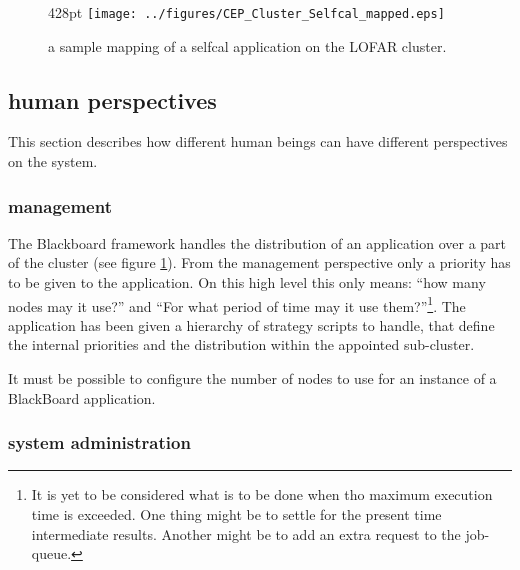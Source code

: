 \documentclass[]{lofar}
\begin{document}
    \begin{figure}{428pt}
      \texttt{[image: ../figures/CEP\_Cluster\_Selfcal\_mapped.eps]}
      \hypertarget{fig:selfcalMapped}{}
      \caption{a sample mapping of a selfcal application on the
        LOFAR cluster.\label{fig:selfcalMapped}}
    \end{figure}


    \subsection{human perspectives}

      This section describes how different human beings can have
      different perspectives on the system.

      \subsubsection{management}

        The Blackboard framework handles the distribution of an
        application over a part of the cluster (see figure
        \hyperlink{fig:selfcalMapped}{\ref{fig:selfcalMapped}}). From
        the management perspective only a priority has to be given to
        the application. On this high level this only means: ``how
        many nodes may it use?'' and ``For what period of time may it
        use them?''\footnote{It is yet to be considered what is to be
        done when tho maximum execution time is exceeded. One thing
        might be to settle for the present time intermediate
        results. Another might be to add an extra request to the
        job-queue.\label{execution-duration}}. The application has
        been given a hierarchy of strategy scripts to handle, that
        define the internal priorities and the distribution within the
        appointed sub-cluster.

        \begin{requirement}
          It must be possible to configure the number of nodes to use
          for an instance of a BlackBoard application.
          \caption{number of nodes\label{req:number-of-nodes}}
        \end{requirement}

      \subsubsection{system administration}
\end{document}
